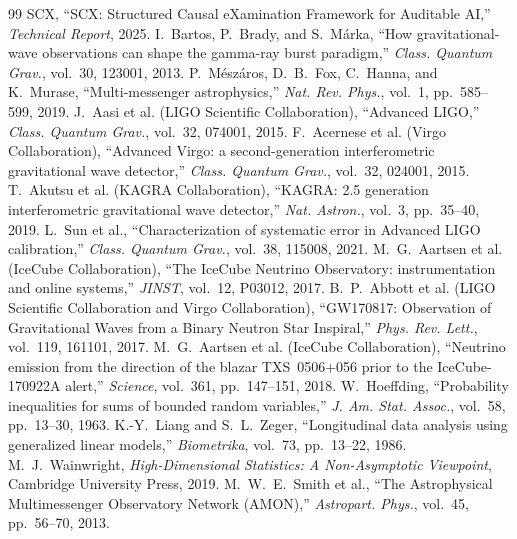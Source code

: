\documentclass[11pt,a4paper]{article}
\theoremstyle{definition}
\begin{document}
\begin{thebibliography}{99}
SCX, ``SCX: Structured Causal eXamination Framework for Auditable AI,'' \textit{Technical Report}, 2025.
I.~Bartos, P.~Brady, and S.~M\'{a}rka, ``How gravitational-wave observations can shape the gamma-ray burst paradigm,'' \textit{Class. Quantum Grav.}, vol.~30, 123001, 2013.
P.~M\'{e}sz\'{a}ros, D.~B.~Fox, C.~Hanna, and K.~Murase, ``Multi-messenger astrophysics,'' \textit{Nat. Rev. Phys.}, vol.~1, pp.~585--599, 2019.
J.~Aasi et al. (LIGO Scientific Collaboration), ``Advanced LIGO,'' \textit{Class. Quantum Grav.}, vol.~32, 074001, 2015.
F.~Acernese et al. (Virgo Collaboration), ``Advanced Virgo: a second-generation interferometric gravitational wave detector,'' \textit{Class. Quantum Grav.}, vol.~32, 024001, 2015.
T.~Akutsu et al. (KAGRA Collaboration), ``KAGRA: 2.5 generation interferometric gravitational wave detector,'' \textit{Nat. Astron.}, vol.~3, pp.~35--40, 2019.
L.~Sun et al., ``Characterization of systematic error in Advanced LIGO calibration,'' \textit{Class. Quantum Grav.}, vol.~38, 115008, 2021.
M.~G.~Aartsen et al. (IceCube Collaboration), ``The IceCube Neutrino Observatory: instrumentation and online systems,'' \textit{JINST}, vol.~12, P03012, 2017.
B.~P.~Abbott et al. (LIGO Scientific Collaboration and Virgo Collaboration), ``GW170817: Observation of Gravitational Waves from a Binary Neutron Star Inspiral,'' \textit{Phys. Rev. Lett.}, vol.~119, 161101, 2017.
M.~G.~Aartsen et al. (IceCube Collaboration), ``Neutrino emission from the direction of the blazar TXS~0506+056 prior to the IceCube-170922A alert,'' \textit{Science}, vol.~361, pp.~147--151, 2018.
W.~Hoeffding, ``Probability inequalities for sums of bounded random variables,'' \textit{J. Am. Stat. Assoc.}, vol.~58, pp.~13--30, 1963.
K.-Y.~Liang and S.~L.~Zeger, ``Longitudinal data analysis using generalized linear models,'' \textit{Biometrika}, vol.~73, pp.~13--22, 1986.
M.~J.~Wainwright, \textit{High-Dimensional Statistics: A Non-Asymptotic Viewpoint}, Cambridge University Press, 2019.
M.~W.~E.~Smith et al., ``The Astrophysical Multimessenger Observatory Network (AMON),'' \textit{Astropart. Phys.}, vol.~45, pp.~56--70, 2013.

\end{thebibliography}
\end{document}
